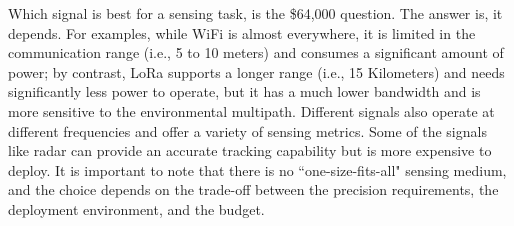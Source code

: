Which signal is best for a sensing task, is the \$64,000 question. The answer is, it depends. For examples, while WiFi is almost
everywhere, it is limited in the communication range (i.e., 5 to 10 meters) and consumes a significant amount of power; by contrast, LoRa
supports a longer range (i.e., 15 Kilometers) and needs significantly less power to operate, but it has a much lower bandwidth and is more
sensitive to the environmental multipath. Different signals also operate at different frequencies and offer a variety of sensing metrics.
Some of the signals like \FMCW radar can provide an accurate tracking capability but is more expensive to deploy. It is important to note
that there is no ``one-size-fits-all" sensing medium, and the choice depends on the trade-off between the precision requirements, the
deployment environment, and the budget.
